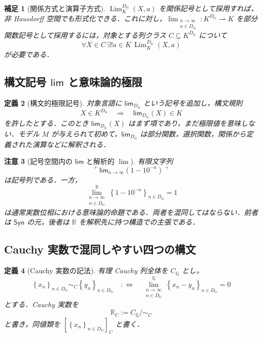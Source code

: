 \documentclass[a4paper,11pt]{ltjsarticle}
\theoremstyle{jpdef}
\newtheorem{definition}{定義}[section]
\newtheorem{remark}[definition]{補足}
\newtheorem{warning}[definition]{注意}
\theoremstyle{jpthm}
\newcommand{\N}{\mathbb{N}}
\newcommand{\Q}{\mathbb{Q}}
\newcommand{\R}{\mathbb{R}}
\newcommand{\Lim}{\operatorname{Lim}}
\newcommand{\DN}{D_{\N}}
\newcommand{\seq}[2]{\left\{#1\right\}_{#2}}
\newcommand{\RealC}{\mathbb{R}_{\mathrm C}}
\begin{document}
\begin{remark}[関係方式と演算子方式]
\(\Lim_K^{\DN}(X,a)\) を関係記号として採用すれば，非 Hausdorff 空間でも形式化できる．これに対し，\(\lim_{\substack{n\to\infty\\ n\in\DN}}:K^{\DN}\rightharpoonup K\) を部分関数記号として採用するには，対象とする列クラス \(C\subseteq K^{\DN}\) について
\[
  \forall X\in C\,\exists!a\in K\,\Lim_K^{\DN}(X,a)
\]
が必要である．
\end{remark}

\subsection{構文記号 \(\mathsf{lim}\) と意味論的極限}

\begin{definition}[構文的極限記号]
対象言語に \(\mathsf{lim}_{\DN}\) という記号を追加し，構文規則
\[
  X\in K^{\DN}\quad\Longrightarrow\quad
  \mathsf{lim}_{\DN}(X)\in K
\]
を許したとする．このとき \(\mathsf{lim}_{\DN}(X)\) はまず項であり，まだ極限値を意味しない．モデル \(M\) が与えられて初めて，\(\mathsf{lim}_{\DN}\) は部分関数，選択関数，関係から定義された演算などに解釈される．
\end{definition}

\begin{warning}[記号空間内の \(\mathsf{lim}\) と解析的 \(\lim\)]
有限文字列
\[
  \ulcorner\mathsf{lim}_{n\to\infty}(1-10^{-n})\urcorner
\]
は記号列である．一方，
\[
  \lim_{\substack{n\to\infty\\ n\in\DN}}^{\R}\seq{1-10^{-n}}{n\in\DN}=1
\]
は通常実数位相における意味論的命題である．両者を混同してはならない．前者は \(\mathsf{Syn}\) の元，後者は \(\R\) を解釈先に持つ構造での主張である．
\end{warning}

\subsection{Cauchy 実数で混同しやすい四つの構文}

\begin{definition}[Cauchy 実数の記法]
有理 Cauchy 列全体を \(C_\Q\) とし，
\[
  \seq{x_n}{n\in\DN}\sim_C\seq{y_n}{n\in\DN}
  \quad:\Longleftrightarrow\quad
  \lim_{\substack{n\to\infty\\ n\in\DN}}^{\Q}\seq{x_n-y_n}{n\in\DN}=0
\]
とする．Cauchy 実数を
\[
  \RealC:=C_\Q/\sim_C
\]
と書き，同値類を \([\seq{x_n}{n\in\DN}]_C\) と書く．
\end{definition}
\end{document}
